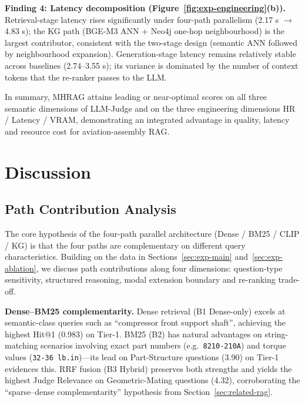 \documentclass[applsci,article,submit,pdftex,moreauthors]{Definitions/mdpi}
\begin{document}
\textbf{Finding 4: Latency decomposition (Figure~\ref{fig:exp-engineering}(b)).} Retrieval-stage latency rises significantly under four-path parallelism (2.17 s $\rightarrow$ 4.83 s); the KG path (BGE-M3 ANN + Neo4j one-hop neighbourhood) is the largest contributor, consistent with the two-stage design (semantic ANN followed by neighbourhood expansion). Generation-stage latency remains relatively stable across baselines (2.74--3.55 s); its variance is dominated by the number of context tokens that the re-ranker passes to the LLM.

In summary, MHRAG attains leading or near-optimal scores on all three semantic dimensions of LLM-Judge and on the three engineering dimensions HR / Latency / VRAM, demonstrating an integrated advantage in quality, latency and resource cost for aviation-assembly RAG.

\section{Discussion}
\label{sec:discussion}

\subsection{Path Contribution Analysis}
\label{sec:disc-path}

The core hypothesis of the four-path parallel architecture (Dense / BM25 / CLIP / KG) is that the four paths are complementary on different query characteristics. Building on the data in Sections~\ref{sec:exp-main} and~\ref{sec:exp-ablation}, we discuss path contributions along four dimensions: question-type sensitivity, structured reasoning, modal extension boundary and re-ranking trade-off.

\textbf{Dense--BM25 complementarity.} Dense retrieval (B1 Dense-only) excels at semantic-class queries such as ``compressor front support shaft'', achieving the highest Hit@1 (0.983) on Tier-1. BM25 (B2) has natural advantages on string-matching scenarios involving exact part numbers (e.g.\ \texttt{8210-210A}) and torque values (\texttt{32-36 lb.in})---its lead on Part-Structure questions (3.90) on Tier-1 evidences this. RRF fusion (B3 Hybrid) preserves both strengths and yields the highest Judge Relevance on Geometric-Mating questions (4.32), corroborating the ``sparse--dense complementarity'' hypothesis from Section~\ref{sec:related-rag}.
\end{document}
